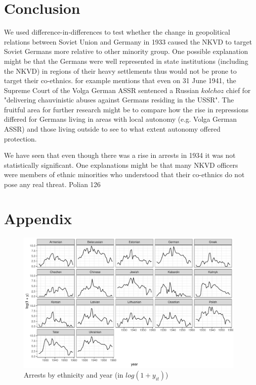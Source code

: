 \documentclass[11pt]{article}
\begin{document}
\section{Conclusion}
We used difference-in-differences to test whether the change in geopolitical relations between Soviet Union and Germany in 1933 caused the NKVD to target Soviet Germans more relative to other minority group. One possible explanation might be that the Germans were well represented in state institutions (including the NKVD) in regions of their heavy settlements thus would not be prone to target their co-ethnics. \citet[p. 126]{polian_against_2003} for example mentions that even on 31 June 1941, the Supreme Court of the Volga German ASSR sentenced a Russian $kolchoz$ chief for "delivering chauvinistic abuses against Germans residing in the USSR". The fruitful area for further research might be to compare how the rise in repressions differed for Germans living in areas with local autonomy (e.g. Volga German ASSR) and those living outside to see to what extent autonomy offered protection. 

We have seen that even though there was a rise in arrests in 1934 it was not statistically significant. One explanations might be that many NKVD officers were members of ethnic minorities who understood that their co-ethnics do not pose any real threat.  Polian 126




\newpage
\section*{Appendix}


\begin{figure}[h]
\centering
\includegraphics[width=1.2\textwidth]{plots/arrests_by_ethnicity.pdf}
\caption{Arrests by ethnicity and year (in $log(1 + y_{it})$)}
\label{fig:universe}
\end{figure}
\newpage

\thispagestyle{empty}
\end{document}
